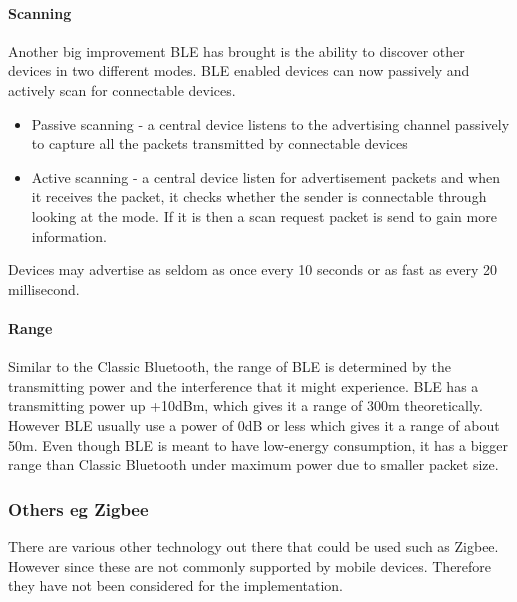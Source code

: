\paragraph*{Scanning\protect \linebreak{}
}

Another big improvement BLE has brought is the ability to discover
other devices in two different modes. BLE enabled devices can now
passively and actively scan for connectable devices.
\begin{itemize}
\item Passive scanning - a central device listens to the advertising channel
passively to capture all the packets transmitted by connectable devices 
\item Active scanning - a central device listen for advertisement packets
and when it receives the packet, it checks whether the sender is connectable
through looking at the mode. If it is then a scan request packet is
send to gain more information.
\end{itemize}
Devices may advertise as seldom as once every 10 seconds or as fast
as every 20 millisecond. 


\paragraph*{Range\protect \\
}

Similar to the Classic Bluetooth, the range of BLE is determined by
the transmitting power and the interference that it might experience.
BLE has a transmitting power up +10dBm, which gives it a range of
300m theoretically. However BLE usually use a power of 0dB or less
which gives it a range of about 50m. Even though BLE is meant to have
low-energy consumption, it has a bigger range than Classic Bluetooth
under maximum power due to smaller packet size. 


\subsubsection{Others eg Zigbee}

There are various other technology out there that could be used such
as Zigbee. However since these are not commonly supported by mobile
devices. Therefore they have not been considered for the implementation.




